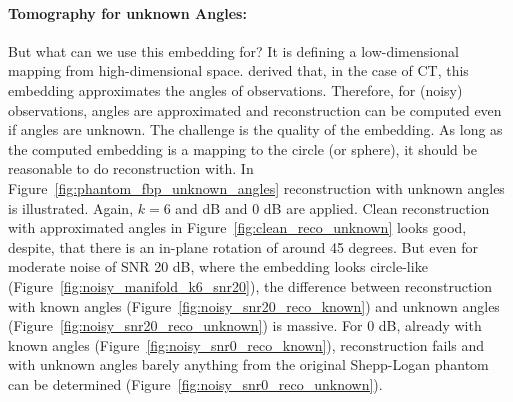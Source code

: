 \paragraph{Tomography for unknown Angles:}
But what can we use this embedding for?
It is defining a low-dimensional mapping from high-dimensional space.
\citet{LaplaceRandomProjections} derived that, in the case of CT, this embedding approximates the angles of observations.
Therefore, for (noisy) observations, angles are approximated and reconstruction can be computed even if angles are unknown.
The challenge is the quality of the embedding. As long as the computed embedding is a mapping to the circle (or sphere),
it should be reasonable to do reconstruction with.
In Figure~\ref{fig:phantom_fbp_unknown_angles} reconstruction with unknown angles is illustrated. Again, $k=6$
and  dB and 0 dB are applied. Clean reconstruction with approximated angles in Figure~\ref{fig:clean_reco_unknown} looks good, 
despite, that there is an in-plane rotation of around 45 degrees. 
But even for moderate noise of SNR 20 dB, where the embedding looks circle-like (Figure~\ref{fig:noisy_manifold_k6_snr20}),
the difference between reconstruction with known angles (Figure~\ref{fig:noisy_snr20_reco_known})
and unknown angles (Figure~\ref{fig:noisy_snr20_reco_unknown}) is massive.
For 0 dB, already with known angles (Figure~\ref{fig:noisy_snr0_reco_known}), reconstruction fails and with unknown angles barely anything from
the original Shepp-Logan phantom can be determined  (Figure~\ref{fig:noisy_snr0_reco_unknown}).

